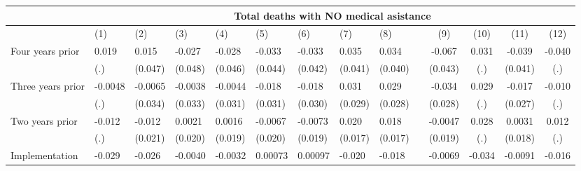 \begin{tabular}{lccccrrrrrcccc}
\toprule
      & \multicolumn{13}{c}{Total deaths with NO medical asistance} \\
\midrule
      & \multicolumn{1}{l}{(1)} & \multicolumn{1}{l}{(2)} & \multicolumn{1}{l}{(3)} & \multicolumn{1}{l}{(4)} & \multicolumn{1}{l}{(5)} & \multicolumn{1}{l}{(6)} & \multicolumn{1}{l}{(7)} & \multicolumn{1}{l}{(8)} &       & (9)   & (10)  & (11)  & (12) \\
\midrule
\midrule
Four years prior & \multicolumn{1}{l}{0.019} & \multicolumn{1}{l}{0.015} & \multicolumn{1}{l}{-0.027} & \multicolumn{1}{l}{-0.028} & \multicolumn{1}{l}{-0.033} & \multicolumn{1}{l}{-0.033} & \multicolumn{1}{l}{0.035} & \multicolumn{1}{l}{0.034} &       & -0.067 & 0.031 & -0.039 & -0.040 \\
      & \multicolumn{1}{l}{(.)} & \multicolumn{1}{l}{(0.047)} & \multicolumn{1}{l}{(0.048)} & \multicolumn{1}{l}{(0.046)} & \multicolumn{1}{l}{(0.044)} & \multicolumn{1}{l}{(0.042)} & \multicolumn{1}{l}{(0.041)} & \multicolumn{1}{l}{(0.040)} &       & (0.043) & (.)   & (0.041) & (.) \\
Three years prior & \multicolumn{1}{l}{-0.0048} & \multicolumn{1}{l}{-0.0065} & \multicolumn{1}{l}{-0.0038} & \multicolumn{1}{l}{-0.0044} & \multicolumn{1}{l}{-0.018} & \multicolumn{1}{l}{-0.018} & \multicolumn{1}{l}{0.031} & \multicolumn{1}{l}{0.029} &       & -0.034 & 0.029 & -0.017 & -0.010 \\
      & \multicolumn{1}{l}{(.)} & \multicolumn{1}{l}{(0.034)} & \multicolumn{1}{l}{(0.033)} & \multicolumn{1}{l}{(0.031)} & \multicolumn{1}{l}{(0.031)} & \multicolumn{1}{l}{(0.030)} & \multicolumn{1}{l}{(0.029)} & \multicolumn{1}{l}{(0.028)} &       & (0.028) & (.)   & (0.027) & (.) \\
Two years prior & \multicolumn{1}{l}{-0.012} & \multicolumn{1}{l}{-0.012} & \multicolumn{1}{l}{0.0021} & \multicolumn{1}{l}{0.0016} & \multicolumn{1}{l}{-0.0067} & \multicolumn{1}{l}{-0.0073} & \multicolumn{1}{l}{0.020} & \multicolumn{1}{l}{0.018} &       & -0.0047 & 0.028 & 0.0031 & 0.012 \\
      & \multicolumn{1}{l}{(.)} & \multicolumn{1}{l}{(0.021)} & \multicolumn{1}{l}{(0.020)} & \multicolumn{1}{l}{(0.019)} & \multicolumn{1}{l}{(0.020)} & \multicolumn{1}{l}{(0.019)} & \multicolumn{1}{l}{(0.017)} & \multicolumn{1}{l}{(0.017)} &       & (0.019) & (.)   & (0.018) & (.) \\
Implementation & \multicolumn{1}{l}{-0.029} & \multicolumn{1}{l}{-0.026} & \multicolumn{1}{l}{-0.0040} & \multicolumn{1}{l}{-0.0032} & \multicolumn{1}{l}{0.00073} & \multicolumn{1}{l}{0.00097} & \multicolumn{1}{l}{-0.020} & \multicolumn{1}{l}{-0.018} &       & -0.0069 & -0.034 & -0.0091 & -0.016 \\

\end{tabular}
